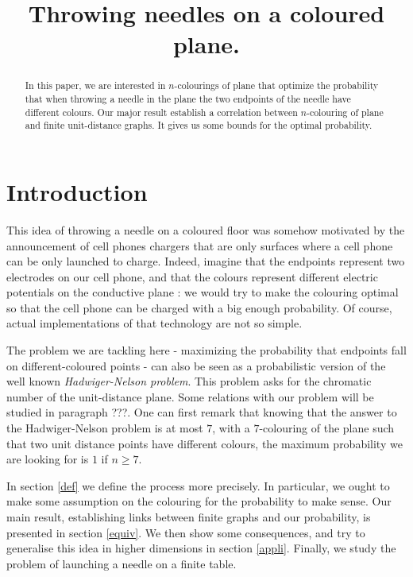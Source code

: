 \documentclass[a4paper,11pt]{article}
\title{Throwing needles on a coloured plane.}
\theoremstyle{definition}
\theoremstyle{remark}
\begin{document}
\maketitle

\begin{abstract}  In this paper, we are interested in $n$-colourings of plane
that optimize the probability that when throwing a needle in the plane the two endpoints of the
needle have different colours. Our major result establish a correlation between
$n$-colouring of plane and finite unit-distance graphs. It gives us
some bounds for the optimal probability.\end{abstract}

\section{Introduction}
This idea of throwing a needle on a coloured floor was somehow motivated by the announcement of cell phones chargers that are only surfaces where a cell phone can be only launched to charge. Indeed, imagine that the endpoints represent two electrodes on our cell phone, and that the colours represent different electric potentials on the conductive plane : we would try to make the colouring optimal so that the cell phone can be charged with a big enough probability. Of course, actual implementations of that technology are not so simple.

The problem we are tackling here - maximizing the probability that endpoints fall on different-coloured points - can also be seen as a probabilistic version of the well known \emph{Hadwiger-Nelson problem}. This problem asks for the chromatic number of the unit-distance plane. Some relations with our problem will be studied in paragraph ???. One can first remark that knowing that the answer to the Hadwiger-Nelson problem is at most $7$, with a $7$-colouring of the plane such that two unit distance points have different colours, the maximum probability we are looking for is $1$ if $n \geq 7$.

In section \ref{def} we define the process more precisely. In particular, we ought to make some assumption on the colouring for the probability to make sense. Our main result, establishing links between finite graphs and our probability, is presented in section \ref{equiv}. We then show some consequences, and try to generalise this idea in higher dimensions in section \ref{appli}. Finally, we study the problem of launching a needle on a finite table.
\end{document}

